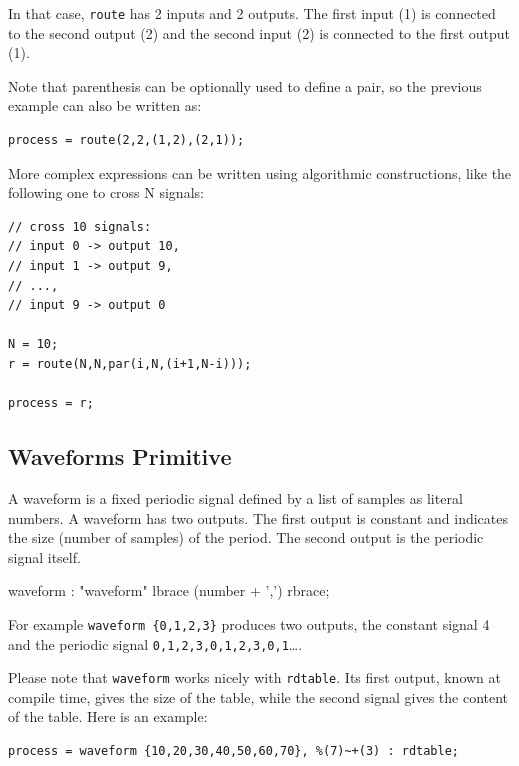 In that case, \lstinline'route' has 2 inputs and 2 outputs. The first input (1) is connected to the second output (2) and the second input (2) is connected to the first output (1).

Note that parenthesis can be optionally used to define a pair, so the previous example can also be written as:

\begin{lstlisting}
process = route(2,2,(1,2),(2,1));
\end{lstlisting}

More complex expressions can be written using algorithmic constructions, like the following one to cross N signals:

\begin{lstlisting}
// cross 10 signals: 
// input 0 -> output 10, 
// input 1 -> output 9, 
// ..., 
// input 9 -> output 0

N = 10;
r = route(N,N,par(i,N,(i+1,N-i)));

process = r;
\end{lstlisting}

\subsection{Waveforms Primitive}

A waveform is a fixed periodic signal defined by a list of samples as literal numbers. A waveform has two outputs. The first output is constant and indicates the size (number of samples) of the period. The second output is the periodic signal itself. 

  \begin{rail}
  waveform : "waveform" lbrace (number + ',') rbrace;
  \end{rail}

For example \lstinline'waveform {0,1,2,3}' produces two outputs, the constant signal 4 and the periodic signal \lstinline'0,1,2,3,0,1,2,3,0,1'\ldots. 

Please note that \lstinline'waveform' works nicely with \lstinline'rdtable'. Its first output, known at compile time, gives the size of the table, while the second signal gives the content of the table. Here is an example:
\begin{lstlisting}
process = waveform {10,20,30,40,50,60,70}, %(7)~+(3) : rdtable;
\end{lstlisting}

